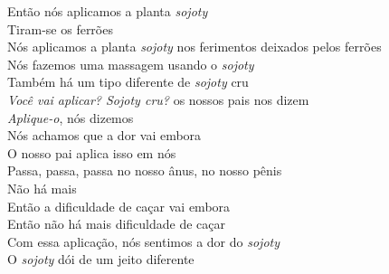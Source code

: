 \begin{linenumbers}\begingroup\raggedright
 
\noindent   Então nós aplicamos a planta \emph{sojoty}\\
  Tiram-se os ferrões\\
  Nós aplicamos a planta \emph{sojoty} nos ferimentos deixados pelos ferrões\\
  Nós fazemos uma massagem usando o \emph{sojoty}\\
  Também há um tipo diferente de \emph{sojoty} cru\\
  \emph{Você vai aplicar? \emph{Sojoty} cru?} os nossos pais nos dizem\\
  \emph{Aplique-o}, nós dizemos\\
  Nós achamos que a dor vai embora\\
  O nosso pai aplica isso em nós\\
  Passa, passa, passa no nosso ânus, no nosso pênis\\
  Não há mais\\
  Então a dificuldade de caçar vai embora\\
  Então não há mais dificuldade de caçar\\
  Com essa aplicação, nós sentimos a dor do \emph{sojoty}\\
  O \emph{sojoty} dói de um jeito diferente
 
\end{linenumbers}\endgroup


